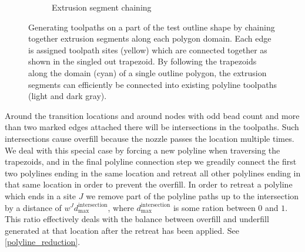 \begin{figure}
\begin{subfigure}{.6\columnwidth}
\caption{Extrusion segment chaining}\label{shape_decomposition_domains}
\end{subfigure}
\caption{
Generating toolpaths on a part of the test outline shape by chaining together extrusion segments along each polygon domain.
Each edge is assigned toolpath sites (yellow) which are connected together as shown in the singled out trapezoid.
By following the trapezoids along the domain (cyan) of a single outline polygon,
the extrusion segments can efficiently be connected into existing polyline toolpaths (light and dark gray).
}
\label{segment_generation}
\end{figure}


Around the transition locations and around nodes with odd bead count and more than two marked edges attached there will be intersections in the toolpaths.
Such intersections cause overfill because the nozzle passes the location multiple times.
We deal with this special case by forcing a new polyline when traversing the trapezoids, and in the final polyline connection step we greadily connect the first two polylines ending in the same location and retreat all other polylines ending in that same location in order to prevent the overfill.
In order to retreat a polyline which ends in a site $J$ we remove part of the polyline paths up to the intersection by a distance of $w^J d_\text{max}^\text{intersection}$, where $d_\text{max}^\text{intersection}$ is some ration between $0$ and $1$.
This ratio effectively deals with the balance between overfill and underfill generated at that location after the retreat has been applied.
See \cref{polyline_reduction}.


